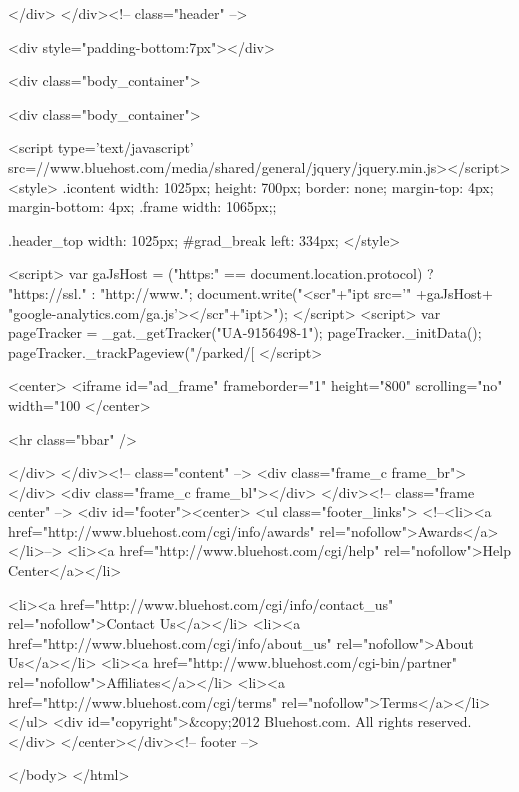 </div>
</div><!-- class="header" -->

<div style="padding-bottom:7px"></div>

<div class="body_container">

<div class="body_container">

<script type='text/javascript' src=//www.bluehost.com/media/shared/general/jquery/jquery.min.js></script>
<style>
.icontent {
    width: 1025px;
    height: 700px;
    border: none;
    margin-top: 4px;
    margin-bottom: 4px;
}
.frame {
    width: 1065px;;
}

.header_top {
    width: 1025px;
}
#grad_break {
    left: 334px;
}
</style>

<script>
    var gaJsHost = ("https:" == document.location.protocol) ? "https://ssl." : "http://www.";
    document.write("<scr"+"ipt src='" +gaJsHost+ "google-analytics.com/ga.js'></scr"+"ipt>");
</script>
<script>
    var pageTracker = _gat._getTracker("UA-9156498-1");
    pageTracker._initData();
    pageTracker._trackPageview("/parked/[%
</script>

<center>
        <iframe id="ad_frame" frameborder="1" height="800" scrolling="no" width="100%
</center>

<hr class="bbar" />

</div>
</div><!-- class="content" -->
<div class="frame_c frame_br"></div>
<div class="frame_c frame_bl"></div>
</div><!-- class="frame center" -->
<div id="footer"><center>
    <ul class="footer_links">
        <!--<li><a href="http://www.bluehost.com/cgi/info/awards" rel="nofollow">Awards</a></li>-->
        <li><a href="http://www.bluehost.com/cgi/help" rel="nofollow">Help Center</a></li>

        <li><a href="http://www.bluehost.com/cgi/info/contact_us" rel="nofollow">Contact Us</a></li>
        <li><a href="http://www.bluehost.com/cgi/info/about_us" rel="nofollow">About Us</a></li>
        <li><a href="http://www.bluehost.com/cgi-bin/partner" rel="nofollow">Affiliates</a></li>
        <li><a href="http://www.bluehost.com/cgi/terms" rel="nofollow">Terms</a></li>
    </ul>
    <div id="copyright">&copy;2012 Bluehost.com. All rights reserved.</div>
</center></div><!-- footer -->


</body>
</html>
